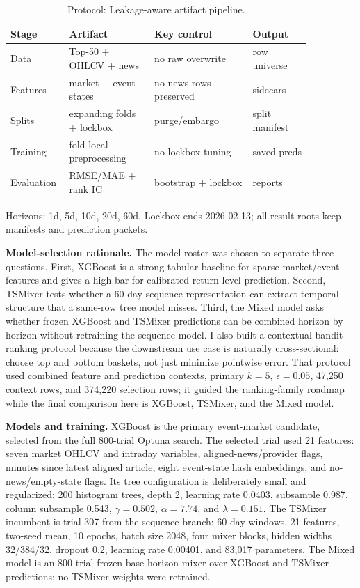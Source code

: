 \documentclass[sigconf,nonacm]{acmart}
\begin{document}
\begin{table}[t]
\centering
\scriptsize
\caption{Protocol: Leakage-aware artifact pipeline.}
\begin{tabular}{@{}p{0.12\linewidth}p{0.26\linewidth}p{0.30\linewidth}p{0.18\linewidth}@{}}
\toprule
Stage & Artifact & Key control & Output \\
\midrule
Data & Top-50 + OHLCV + news & no raw overwrite & row universe \\
Features & market + event states & no-news rows preserved & sidecars \\
Splits & expanding folds + lockbox & purge/embargo & split manifest \\
Training & fold-local preprocessing & no lockbox tuning & saved preds \\
Evaluation & RMSE/MAE + rank IC & bootstrap + lockbox & reports \\
\bottomrule
\end{tabular}
\vspace{0.25em}

\parbox{0.95\linewidth}{\scriptsize Horizons: 1d, 5d, 10d, 20d, 60d. Lockbox ends 2026-02-13; all result roots keep manifests and prediction packets.}
\label{tab:protocol}
\end{table}

\textbf{Model-selection rationale.} The model roster was chosen to separate three questions. First, XGBoost is a strong tabular baseline for sparse market/event features and gives a high bar for calibrated return-level prediction. Second, TSMixer tests whether a 60-day sequence representation can extract temporal structure that a same-row tree model misses. Third, the Mixed model asks whether frozen XGBoost and TSMixer predictions can be combined horizon by horizon without retraining the sequence model. I also built a contextual bandit ranking protocol because the downstream use case is naturally cross-sectional: choose top and bottom baskets, not just minimize pointwise error. That protocol used combined feature and prediction contexts, primary $k=5$, $\epsilon=0.05$, 47,250 context rows, and 374,220 selection rows; it guided the ranking-family roadmap while the final comparison here is XGBoost, TSMixer, and the Mixed model.

\textbf{Models and training.} XGBoost is the primary event-market candidate, selected from the full 800-trial Optuna search. The selected trial used 21 features: seven market OHLCV and intraday variables, aligned-news/provider flags, minutes since latest aligned article, eight event-state hash embeddings, and no-news/empty-state flags. Its tree configuration is deliberately small and regularized: 200 histogram trees, depth 2, learning rate 0.0403, subsample 0.987, column subsample 0.543, $\gamma=0.502$, $\alpha=7.74$, and $\lambda=0.151$. The TSMixer incumbent is trial 307 from the sequence branch: 60-day windows, 21 features, two-seed mean, 10 epochs, batch size 2048, four mixer blocks, hidden widths 32/384/32, dropout 0.2, learning rate 0.00401, and 83,017 parameters. The Mixed model is an 800-trial frozen-base horizon mixer over XGBoost and TSMixer predictions; no TSMixer weights were retrained.
\end{document}
